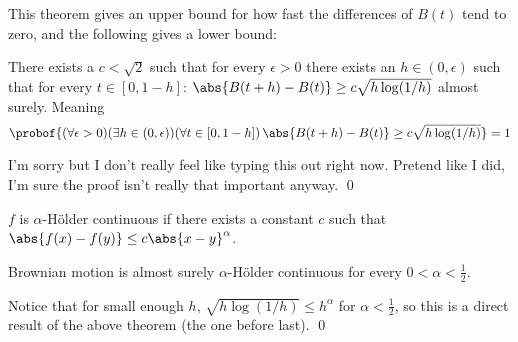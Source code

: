 This theorem gives an upper bound for how fast the differences of $B(t)$ tend to zero, and the following gives a lower bound:

\bthrm

    There exists a $c<\sqrt2$ such that for every $\epsilon>0$ there exists an $h\in(0,\epsilon)$ such that for every $t\in[0,1-h]$: $\abs{B(t+h)-B(t)}\geq c\sqrt{h\log(1/h)}$ almost surely.
    Meaning
    $$ \probof{(\forall\epsilon>0)(\exists h\in(0,\epsilon))(\forall t\in[0,1-h])\,\abs{B(t+h)-B(t)}\geq c\sqrt{h\log(1/h)}} = 1 $$

\ethrm

I'm sorry but I don't really feel like typing this out right now.
Pretend like I did, I'm sure the proof isn't really that important anyway.
\qed

\bdefn

    $f$ is {\emphcolor $\alpha$-H\"older continuous} if there exists a constant $c$ such that $\abs{f(x)-f(y)}\leq c\abs{x-y}^\alpha$.

\edefn

\bcoro

    Brownian motion is almost surely $\alpha$-H\"older continuous for every $0<\alpha<\frac12$.

\ecoro

Notice that for small enough $h$, $\sqrt{h\log(1/h)}\leq h^\alpha$ for $\alpha<\frac12$, so this is a direct result of the above theorem (the one before last).
\qed

\bye


